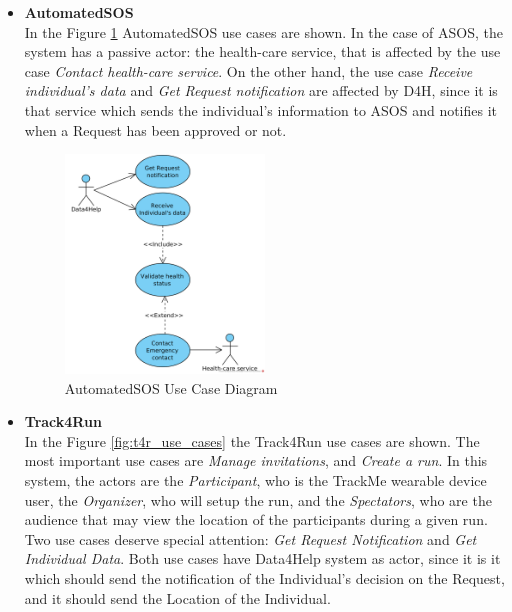 \documentclass[a4paper, hidelinks, 12pt]{report}
\begin{document}
\begin{itemize}
		\item{\textbf{AutomatedSOS}}\\
		In the Figure \ref{fig:asos_use_cases} AutomatedSOS use cases are shown. In the case of ASOS, the system has a passive actor: the health-care service, that is affected by the use case \textit{Contact health-care service}. On the other hand, the use case \textit{Receive individual's data} and \textit{Get Request notification} are affected by D4H, since it is that service which sends the individual's information to ASOS and notifies it when a Request has been approved or not.
		
		\begin{figure}[H]
			\centering
			\includegraphics[width=0.5\textwidth]{Diagrams/asos_use_cases.png}
			\caption[AutomatedSOS Use Case Diagram]{AutomatedSOS Use Case Diagram}
			\label{fig:asos_use_cases}
		\end{figure}
		
		\item{\textbf{Track4Run}}\\
		In the Figure \ref{fig:t4r_use_cases} the Track4Run use cases are shown. The most important use cases are \textit{Manage invitations}, and \textit{Create a run}. In this system, the actors are the \textit{Participant}, who is the TrackMe wearable device user, the \textit{Organizer}, who will setup the run, and the \textit{Spectators}, who are the audience that may view the location of the participants during a given run.\\
		
		Two use cases deserve special attention: \textit{Get Request Notification} and \textit{Get Individual Data}. Both use cases have Data4Help system as actor, since it is it which should send the notification of the Individual's decision on the Request, and it should send the Location of the Individual.
		

\end{itemize}
\end{document}
